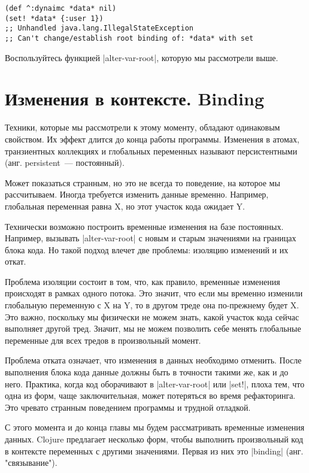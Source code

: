 \begin{verbatim}
(def ^:dynaimc *data* nil)
(set! *data* {:user 1})
;; Unhandled java.lang.IllegalStateException
;; Can't change/establish root binding of: *data* with set
\end{verbatim}

Воспользуйтесь функцией \spverb|alter-var-root|, которую мы рассмотрели выше.

\section{Изменения в контексте. Binding}

Техники, которые мы рассмотрели к этому моменту, обладают одинаковым
свойством. Их эффект длится до конца работы программы. Изменения в атомах,
транзиентных коллекциях и глобальных переменных называют персистентными
(анг. persistent~--- постоянный).

Может показаться странным, но это не всегда то поведение, на которое мы
рассчитываем. Иногда требуется изменить данные временно. Например, глобальная
переменная равна X, но этот участок кода ожидает Y.

Технически возможно построить временные изменения на базе постоянных. Например,
вызывать \spverb|alter-var-root| с новым и старым значениями на границах блока кода. Но
такой подход влечет две проблемы: изоляцию изменений и их откат.

Проблема изоляции состоит в том, что, как правило, временные изменения
происходят в рамках одного потока. Это значит, что если мы временно изменили
глобальную переменную с X на Y, то в другом треде она по-прежнему будет X. Это
важно, поскольку мы физически не можем знать, какой участок кода сейчас
выполняет другой тред. Значит, мы не можем позволить себе менять глобальные
переменные для всех тредов в произвольный момент.

Проблема отката означает, что изменения в данных необходимо отменить. После
выполнения блока кода данные должны быть в точности такими же, как и до
него. Практика, когда код оборачивают в \spverb|alter-var-root| или \spverb|set!|, плоха тем,
что одна из форм, чаще заключительная, может потеряться во время
рефакторинга. Это чревато странным поведением программы и трудной отладкой.

С этого момента и до конца главы мы будем рассматривать временные изменения
данных. Clojure предлагает несколько форм, чтобы выполнить произвольный код в
контексте переменных с другими значениями. Первая из них это \spverb|binding|
(анг. "связывание").


